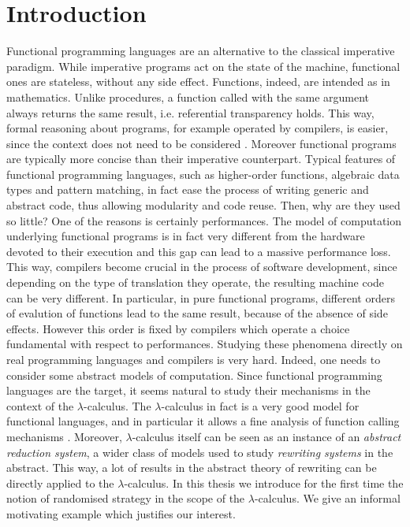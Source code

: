 \chapter{Introduction}\label{ch:introduction}
Functional programming languages are an alternative to the classical imperative paradigm. While imperative programs act on the state of the machine, functional ones are stateless, without any side effect. Functions, indeed, are intended as in mathematics. Unlike procedures, a function called with the same argument always returns the same result, i.e. referential transparency holds. This way, formal reasoning about programs, for example operated by compilers, is easier, since the context does not need to be considered \cite{backus_can_1978}. Moreover functional programs are typically more concise than their imperative counterpart. Typical features of functional programming languages, such as higher-order functions, algebraic data types and pattern matching, in fact ease the process of writing generic and abstract code, thus allowing modularity and code reuse. Then, why are they used so little? One of the reasons is certainly performances. The model of computation underlying functional programs is in fact very different from the hardware devoted to their execution and this gap can lead to a massive performance loss. This way, compilers become crucial in the process of software development, since depending on the type of translation they operate, the resulting machine code can be very different. In particular, in pure functional programs, different orders of evalution of functions lead to the same result, because of the absence of side effects. However this order is fixed by compilers which operate a choice fundamental with respect to performances. Studying these phenomena directly on real programming languages and compilers is very hard. Indeed, one needs to consider some abstract models of computation. Since functional programming languages are the target, it seems natural to study their mechanisms in the context of the $\lambda$-calculus. The $\lambda$-calculus in fact is a very good model for functional languages, and in particular it allows a fine analysis of function calling mechanisms \cite{plotkin_call-by-name_1975}. Moreover, $\lambda$-calculus itself can be seen as an instance of an \emph{abstract reduction system}, a wider class of models used to study \emph{rewriting systems} in the abstract. This way, a lot of results in the abstract theory of rewriting can be directly applied to the $\lambda$-calculus. In this thesis we introduce for the first time the notion of randomised strategy in the scope of the $\lambda$-calculus. We give an informal motivating example which justifies our interest.
